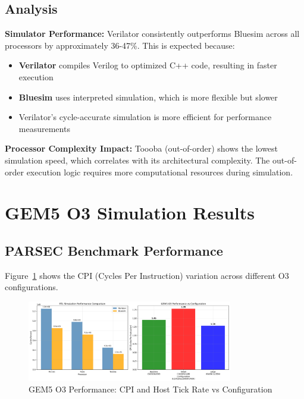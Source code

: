 \documentclass[11pt]{article}
\begin{document}
\subsection{Analysis}

\textbf{Simulator Performance:} Verilator consistently outperforms Bluesim across all processors by approximately 36-47\%. This is expected because:

\begin{itemize}
    \item \textbf{Verilator} compiles Verilog to optimized C++ code, resulting in faster execution
    \item \textbf{Bluesim} uses interpreted simulation, which is more flexible but slower
    \item Verilator's cycle-accurate simulation is more efficient for performance measurements
\end{itemize}

\textbf{Processor Complexity Impact:} Toooba (out-of-order) shows the lowest simulation speed, which correlates with its architectural complexity. The out-of-order execution logic requires more computational resources during simulation.

\section{GEM5 O3 Simulation Results}

\subsection{PARSEC Benchmark Performance}

Figure~\ref{fig:gem5_cpi} shows the CPI (Cycles Per Instruction) variation across different O3 configurations.

\begin{figure}[h]
\centering
\includegraphics[width=0.8\textwidth]{gem5_performance_comparison.png}
\caption{GEM5 O3 Performance: CPI and Host Tick Rate vs Configuration}
\label{fig:gem5_cpi}
\end{figure}
\end{document}
